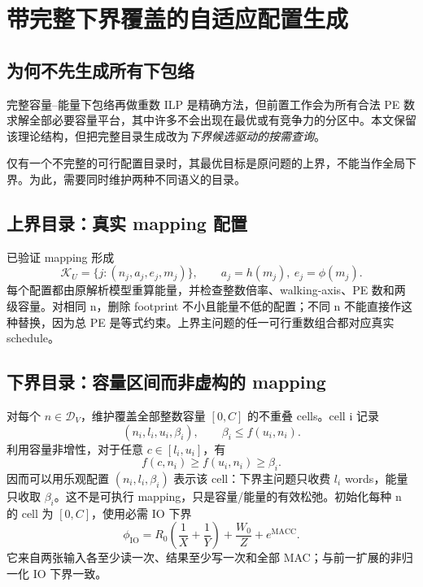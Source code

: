 \documentclass[UTF8,11pt,a4paper,fontset=fandol]{ctexart}
\theoremstyle{remark}\newtheorem{remark}[proposition]{说明}
\numberwithin{equation}{section}
\begin{document}
\section{带完整下界覆盖的自适应配置生成}
\label{sec:adaptive}
\subsection{为何不先生成所有下包络}
完整容量--能量下包络再做重数 ILP 是精确方法\cite{batch}，但前置工作会为所有合法 PE 数求解全部必要容量平台，其中许多不会出现在最优或有竞争力的分区中。本文保留该理论结构，但把完整目录生成改为\emph{下界候选驱动的按需查询}。

仅有一个不完整的可行配置目录时，其最优目标是原问题的上界，不能当作全局下界。为此，需要同时维护两种不同语义的目录。

\subsection{上界目录：真实 mapping 配置}
已验证 mapping 形成
\begin{equation}
\mathcal K_U=\{j:(n_j,a_j,e_j,m_j)\},\qquad
 a_j=h(m_j),\ e_j=\phi(m_j).
\end{equation}
每个配置都由原解析模型重算能量，并检查整数倍率、walking-axis、PE 数和两级容量。对相同 n，删除 footprint 不小且能量不低的配置；不同 n 不能直接作这种替换，因为总 PE 是等式约束。上界主问题的任一可行重数组合都对应真实 schedule。

\subsection{下界目录：容量区间而非虚构的 mapping}
对每个 $n\in\mathcal D_V$，维护覆盖全部整数容量 $[0,C]$ 的不重叠 cells。cell i 记录
\begin{equation}
(n_i,l_i,u_i,\beta_i),\qquad \beta_i\le f(u_i,n_i).
\label{eq:cell}
\end{equation}
利用容量非增性，对于任意 $c\in[l_i,u_i]$，有
\begin{equation}
f(c,n_i)\ge f(u_i,n_i)\ge\beta_i.
\label{eq:cell-lower}
\end{equation}
因而可以用乐观配置 $(n_i,l_i,\beta_i)$ 表示该 cell：下界主问题只收费 $l_i$ words，能量只收取 $\beta_i$。这不是可执行 mapping，只是容量/能量的有效松弛。初始化每种 n 的 cell 为 $[0,C]$，使用必需 IO 下界
\begin{equation}
\phi_{\mathrm{IO}}=R_0\left(\frac1X+\frac1Y\right)+\frac{W_0}{Z}+e^{\mathrm{MACC}}.
\label{eq:IO}
\end{equation}
它来自两张输入各至少读一次、结果至少写一次和全部 MAC；与前一扩展的非归一化 IO 下界一致\cite{batch}。
\end{document}

